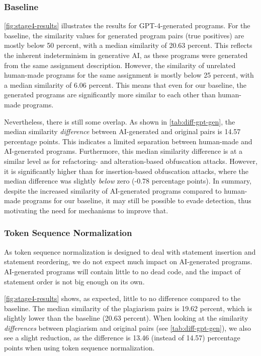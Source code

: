  

\subsubsection{Baseline}
\autoref{fig:stage4-results} illustrates the results for GPT-4-generated programs.
For the baseline, the similarity values for generated program pairs (true positives) are mostly below 50 percent, with a median similarity of 20.63 percent.
This reflects the inherent indeterminism in generative AI, as these programs were generated from the same assignment description.
However, the similarity of unrelated human-made programs for the same assignment is mostly below 25 percent, with a median similarity of 6.06 percent.
This means that even for our baseline, the generated programs are significantly more similar to each other than human-made programs.

Nevertheless, there is still some overlap. 
As shown in \autoref{tab:diff-gpt-gen}, the median similarity \textit{difference} between AI-generated and original pairs is 14.57 percentage points. 
This indicates a limited separation between human-made and AI-generated programs. Furthermore, this median similarity difference is at a similar level as for refactoring- and alteration-based obfuscation attacks.
However, it is significantly higher than for insertion-based obfuscation attacks, where the median difference was slightly \textit{below} zero (-0.78 percentage points).
In summary, despite the increased similarity of AI-generated programs compared to human-made programs for our baseline, it may still be possible to evade detection, thus motivating the need for mechanisms to improve that.

\subsubsection{Token Sequence Normalization}
As token sequence normalization is designed to deal with statement insertion and statement reordering, we do not expect much impact on AI-generated programs.
AI-generated programs will contain little to no dead code, and the impact of statement order is not big enough on its own.

\autoref{fig:stage4-results} shows, as expected, little to no difference compared to the baseline.
The median similarity of the plagiarism pairs is 19.62 percent, which is slightly lower than the baseline (20.63 percent).
When looking at the similarity \textit{differences} between plagiarism and original pairs (see \autoref{tab:diff-gpt-gen}), we also see a slight reduction, as the difference is 13.46 (instead of 14.57) percentage points when using token sequence normalization.

